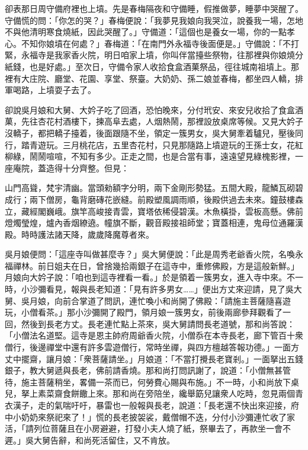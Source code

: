 卻表那日周守備府裡也上墳。先是春梅隔夜和守備睡，假推做夢，睡夢中哭醒了。{}守備慌的問：「你怎的哭？」春梅便說：「我夢見我娘向我哭泣，說養我一場，怎地不與他清明寒食燒紙，因此哭醒了。」守備道：「這個也是養女一場，你的一點孝心。不知你娘墳在何處？」春梅道：「在南門外永福寺後面便是。」守備說：「不打緊，永福寺是我家香火院，明日咱家上墳，你叫伴當擡些祭物，往那裡與你娘燒分紙錢，也是好處。」至次日，守備令家人收拾食盒酒菓祭品，徑往城南祖墳上。那裡有大庄院、廳堂、花園、享堂、祭臺。大奶奶、孫二娘並春梅，都坐四人轎，排軍喝路，上墳耍子去了。

卻說吳月娘和大舅、大妗子吃了回酒，恐怕晚來，分付玳安、來安兒收拾了食盒酒菓，先往杏花村酒樓下，揀高阜去處，人烟熱鬧，那裡設放桌席等候。又見大妗子沒轎子，都把轎子擡着，後面跟隨不坐，領定一簇男女，吳大舅牽着驢兒，壓後同行，踏青遊玩。三月桃花店，五里杏花村，只見那隨路上墳遊玩的王孫士女，花紅柳綠，鬧鬧喧喧，不知有多少。正走之間，也是合當有事，遠遠望見綠槐影裡，一座庵院，蓋造得十分齊整。但見：

\begin{myquote}
山門高聳，梵宇清幽。當頭勑額字分明，兩下金剛形勢猛。五間大殿，龍鱗瓦砌碧成行；兩下僧房，龜背磨磚花嵌縫。前殿塑風調雨順，後殿供過去未來。鐘鼓樓森立，藏經閣巍峨。旗竿高峻接青雲，寶塔依稀侵碧漢。木魚橫掛，雲板高懸。佛前燈燭瑩煌，爐內香烟繚遶。幢旗不斷，觀音殿接祖師堂；寶蓋相連，鬼母位通羅漢殿。時時護法諸天降，歲歲降魔尊者來。
\end{myquote}

吳月娘便問：「這座寺叫做甚麼寺？」吳大舅便說：「此是周秀老爺香火院，名喚永福禪林。前日姐夫在日，曾捨幾拾兩銀子在這寺中，重修佛殿，方是這般新鮮。」月娘向大妗子說：「咱也到這寺裡看一看。」於是領着一簇男女，進入寺中來。不一時，小沙彌看見，報與長老知道：「見有許多男女……」便出方丈來迎請，見了吳大舅、吳月娘，向前合掌道了問訊，連忙喚小和尚開了佛殿：「請施主菩薩隨喜遊玩，小僧看茶。」那小沙彌開了殿門，領月娘一簇男女，前後兩廊參拜觀看了一回，然後到長老方丈。長老連忙點上茶來，吳大舅請問長老道號，那和尚答說：「小僧法名道堅。這寺是恩主帥府周爺香火院，小僧忝在本寺長老，廊下管百十衆僧行，後邊禪堂中還有許多雲遊僧行，常時坐禪，{}與四方檀越答報功德。」一面方丈中擺齋，讓月娘：「衆菩薩請坐。」月娘道：「不當打攪長老寶剎。」一面拏出五錢銀子，教大舅遞與長老，佛前請香燒。那和尚打問訊謝了，說道：「小僧無甚管待，施主菩薩稍坐，畧備一茶而已，何勞費心賜與布施。」不一時，小和尚放下桌兒，拏上素菜齋食餅饊上來。那和尚在旁陪坐，纔舉筯兒讓衆人吃時，忽見兩個青衣漢子，走的氣喘吁吁，暴雷也一般報與長老，說道：「長老還不快出來迎接，府中小奶奶來祭祀來了！」慌的長老披袈裟，戴僧帽不迭，分付小沙彌連忙收了家活，「請列位菩薩且在小房避避，打發小夫人燒了紙，祭畢去了，再款坐一會不遲。」吳大舅告辭，和尚死活留住，又不肯放。

